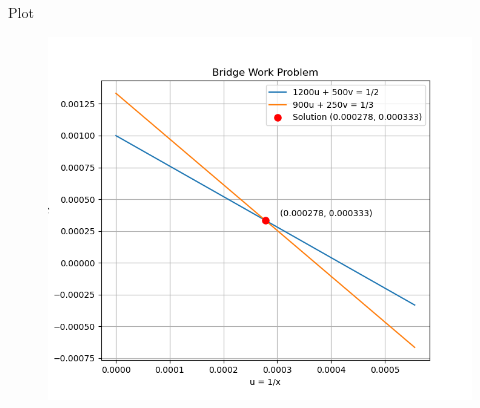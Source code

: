 \documentclass{beamer}
\begin{document}
\begin{frame}{Plot}

\begin{figure}[h!]
    \centering
    \includegraphics[height=0.5\textheight, keepaspectratio]{figs/Figure_1.png}
    \label{figure_1}
\end{figure}
\end{frame} 
\end{document}
